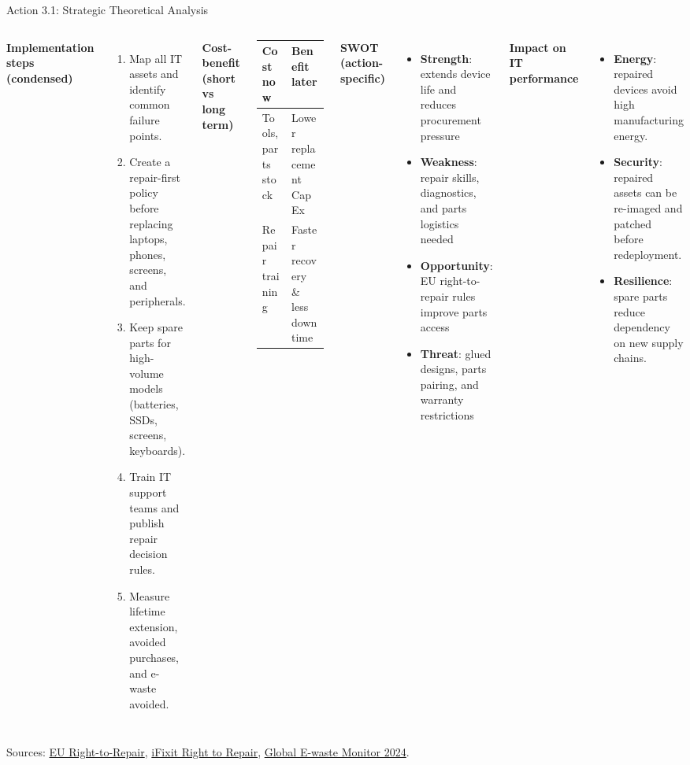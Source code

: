 \documentclass[aspectratio=169]{beamer}
\begin{document}

\begin{frame}{Action 3.1: Strategic Theoretical Analysis}
\scriptsize
\begin{columns}[T,totalwidth=\textwidth]
\textbf{Implementation steps (condensed)}
\begin{enumerate}
  \item Map all IT assets and identify common failure points.
  \item Create a repair-first policy before replacing laptops, phones, screens, and peripherals.
  \item Keep spare parts for high-volume models (batteries, SSDs, screens, keyboards).
  \item Train IT support teams and publish repair decision rules.
  \item Measure lifetime extension, avoided purchases, and e-waste avoided.
\end{enumerate}

\textbf{Cost-benefit (short vs long term)}
\begin{tabular}{p{2.1cm}p{2.4cm}}
\toprule
Cost now & Benefit later \\
\midrule
Tools, parts stock & Lower replacement CapEx \\
Repair training & Faster recovery \& less downtime \\
\bottomrule
\end{tabular}

\textbf{SWOT (action-specific)}
\begin{itemize}
  \item \textbf{Strength}: extends device life and reduces procurement pressure
  \item \textbf{Weakness}: repair skills, diagnostics, and parts logistics needed
  \item \textbf{Opportunity}: EU right-to-repair rules improve parts access
  \item \textbf{Threat}: glued designs, parts pairing, and warranty restrictions
\end{itemize}

\textbf{Impact on IT performance}
\begin{itemize}
  \item \textbf{Energy}: repaired devices avoid high manufacturing energy.
  \item \textbf{Security}: repaired assets can be re-imaged and patched before redeployment.
  \item \textbf{Resilience}: spare parts reduce dependency on new supply chains.
\end{itemize}
\end{columns}
\vspace{0.1cm}
\tiny Sources: \href{https://commission.europa.eu/law/law-topic/consumer-protection-law/directive-repair-goods_en}{EU Right-to-Repair}, \href{https://www.ifixit.com/Right-to-Repair}{iFixit Right to Repair}, \href{https://ewastemonitor.info/the-global-e-waste-monitor-2024/}{Global E-waste Monitor 2024}.
\end{frame}
\end{document}
